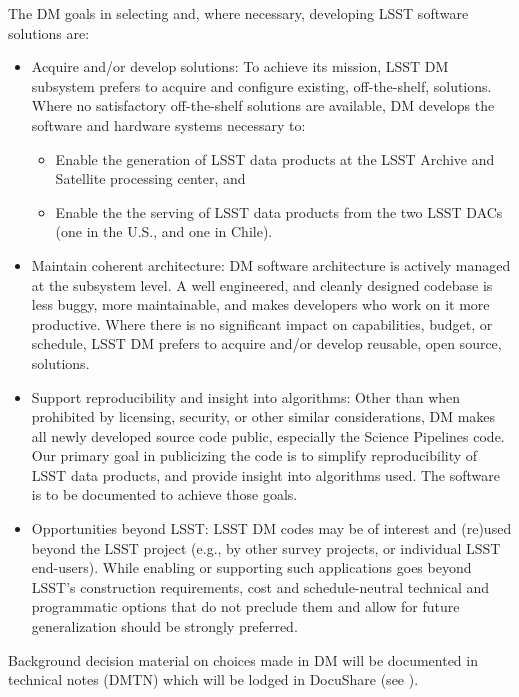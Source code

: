 The DM goals in selecting and, where necessary, developing LSST software solutions are:

\begin{itemize}
	\item Acquire and/or develop solutions: To achieve its mission, LSST DM subsystem prefers to acquire and configure existing, off-the-shelf, solutions. Where no satisfactory off-the-shelf solutions are available, DM develops the software and hardware systems necessary to:
\begin{itemize}
	\item Enable the generation of LSST data products at the LSST Archive and Satellite processing center, and
	\item Enable the the serving of LSST data products from the two LSST DACs (one in the U.S., and one in Chile).
\end{itemize}
	\item Maintain coherent architecture: DM software architecture is actively managed at the subsystem level. A well engineered, and cleanly designed codebase is less buggy, more maintainable, and makes developers who work on it more productive. Where there is no significant impact on capabilities, budget, or schedule, LSST DM prefers to acquire and/or develop reusable, open source, solutions.
	\item Support reproducibility and insight into algorithms: Other than when prohibited by licensing, security, or other similar considerations, DM makes all newly developed source code public, especially the Science Pipelines code. Our primary goal in publicizing the code is to simplify reproducibility of LSST data products, and provide insight into algorithms used. The software is to be documented to achieve those goals. 
	\item Opportunities beyond LSST: LSST DM codes may be of interest and (re)used beyond the LSST project (e.g., by other survey projects, or individual LSST end-users). While enabling or supporting such applications goes beyond LSST’s construction requirements, cost and schedule-neutral technical and programmatic options that do not preclude them and allow for future generalization should be strongly preferred.


\end{itemize}

Background decision material on choices made in DM will be documented in technical notes (DMTN) which will be lodged in DocuShare (see ).
